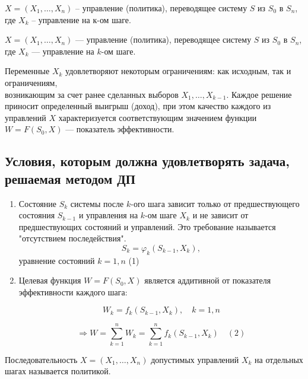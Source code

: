\documentclass[17pt]{extarticle}
\begin{document}
$X=(X_1, \dots, X_n)$ -- управление (политика), переводящее систему $S$ из $S_0$ в $S_n$, где $X_k$ -- управление на к-ом шаге.

\( X = (X_{1}, \ldots, X_{n}) \) — управление (политика), переводящее систему \( S \) из \( S_0 \) в \( S_n \), где
\( X_k \) — управление на \( k \)-ом шаге.

Переменные \( X_k \) удовлетворяют некоторым ограничениям: как исходным, так и ограничениям, \\
возникающим за счет ранее сделанных выборов
\( X_{1}, \ldots, X_{k-1} \).
Каждое решение приносит определенный выигрыш (доход),
при этом качество каждого из управлений \( X \) характеризуется
соответствующим значением функции \( W = F(S_0, X) \) — показатель эффективности.

\subsection{Условия, которым должна удовлетворять задача, решаемая методом ДП}
\begin{enumerate}
    \item Состояние \( S_k \) системы после \( k \)-ого шага зависит только от предшествующего состояния \( S_{k-1} \) и
          управления на \( k \)-ом шаге \( X_k \) и не зависит от предшествующих состояний и управлений.
          Это требование называется "отсутствием последействия".
          \[
              S_k = \varphi_k (S_{k-1}, X_k),
          \]
          уравнение состояний \( k = 1, n \) \quad (1)

    \item Целевая функция \( W = F(S_0, X) \) является аддитивной от показателя эффективности каждого шага:

          \[
              W_k = f_k (S_{k-1}, X_k), \quad k = 1, n
          \]

          \[
              \Rightarrow W = \sum_{k=1}^n W_k = \sum_{k=1}^n f_k (S_{k-1}, X_k) \quad (2)
          \]
\end{enumerate}
\begin{definition}
    Последовательность \( X = (X_1, \ldots, X_n) \) допустимых управлений \( X_k \) на отдельных шагах называется политикой.
\end{definition}
\end{document}
